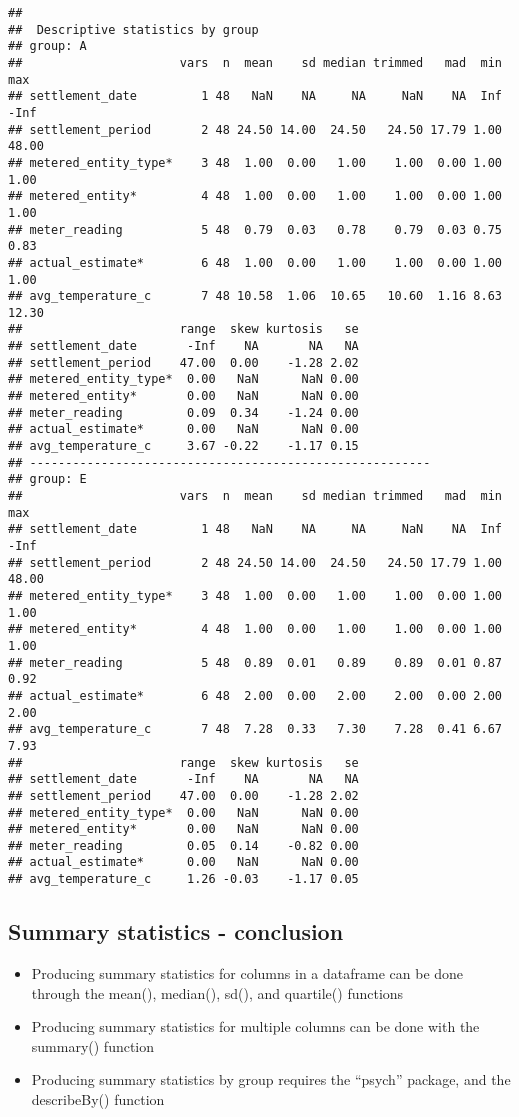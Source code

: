 \documentclass[]{article}
\providecommand{\tightlist}{%
  \setlength{\itemsep}{0pt}\setlength{\parskip}{0pt}}
\begin{document}
\begin{verbatim}
## 
##  Descriptive statistics by group 
## group: A
##                      vars  n  mean    sd median trimmed   mad  min   max
## settlement_date         1 48   NaN    NA     NA     NaN    NA  Inf  -Inf
## settlement_period       2 48 24.50 14.00  24.50   24.50 17.79 1.00 48.00
## metered_entity_type*    3 48  1.00  0.00   1.00    1.00  0.00 1.00  1.00
## metered_entity*         4 48  1.00  0.00   1.00    1.00  0.00 1.00  1.00
## meter_reading           5 48  0.79  0.03   0.78    0.79  0.03 0.75  0.83
## actual_estimate*        6 48  1.00  0.00   1.00    1.00  0.00 1.00  1.00
## avg_temperature_c       7 48 10.58  1.06  10.65   10.60  1.16 8.63 12.30
##                      range  skew kurtosis   se
## settlement_date       -Inf    NA       NA   NA
## settlement_period    47.00  0.00    -1.28 2.02
## metered_entity_type*  0.00   NaN      NaN 0.00
## metered_entity*       0.00   NaN      NaN 0.00
## meter_reading         0.09  0.34    -1.24 0.00
## actual_estimate*      0.00   NaN      NaN 0.00
## avg_temperature_c     3.67 -0.22    -1.17 0.15
## -------------------------------------------------------- 
## group: E
##                      vars  n  mean    sd median trimmed   mad  min   max
## settlement_date         1 48   NaN    NA     NA     NaN    NA  Inf  -Inf
## settlement_period       2 48 24.50 14.00  24.50   24.50 17.79 1.00 48.00
## metered_entity_type*    3 48  1.00  0.00   1.00    1.00  0.00 1.00  1.00
## metered_entity*         4 48  1.00  0.00   1.00    1.00  0.00 1.00  1.00
## meter_reading           5 48  0.89  0.01   0.89    0.89  0.01 0.87  0.92
## actual_estimate*        6 48  2.00  0.00   2.00    2.00  0.00 2.00  2.00
## avg_temperature_c       7 48  7.28  0.33   7.30    7.28  0.41 6.67  7.93
##                      range  skew kurtosis   se
## settlement_date       -Inf    NA       NA   NA
## settlement_period    47.00  0.00    -1.28 2.02
## metered_entity_type*  0.00   NaN      NaN 0.00
## metered_entity*       0.00   NaN      NaN 0.00
## meter_reading         0.05  0.14    -0.82 0.00
## actual_estimate*      0.00   NaN      NaN 0.00
## avg_temperature_c     1.26 -0.03    -1.17 0.05
\end{verbatim}

\subsection{Summary statistics -
conclusion}\label{summary-statistics---conclusion}

\begin{itemize}
\tightlist
\item
  Producing summary statistics for columns in a dataframe can be done
  through the mean(), median(), sd(), and quartile() functions
\item
  Producing summary statistics for multiple columns can be done with the
  summary() function
\item
  Producing summary statistics by group requires the ``psych'' package,
  and the describeBy() function
\end{itemize}
\end{document}
